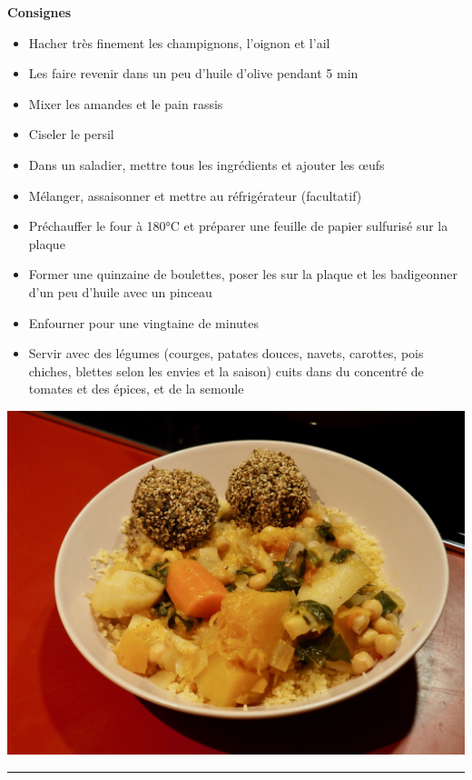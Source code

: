 \documentclass[]{book}
\providecommand{\tightlist}{%
  \setlength{\itemsep}{0pt}\setlength{\parskip}{0pt}}
\begin{document}
\textbf{Consignes}

\begin{itemize}
\tightlist
\item
  Hacher très finement les champignons, l'oignon et l'ail
\item
  Les faire revenir dans un peu d'huile d'olive pendant 5 min
\item
  Mixer les amandes et le pain rassis
\item
  Ciseler le persil
\item
  Dans un saladier, mettre tous les ingrédients et ajouter les œufs
\item
  Mélanger, assaisonner et mettre au réfrigérateur (facultatif)
\item
  Préchauffer le four à 180°C et préparer une feuille de papier sulfurisé sur la plaque
\item
  Former une quinzaine de boulettes, poser les sur la plaque et les badigeonner d'un peu d'huile avec un pinceau
\item
  Enfourner pour une vingtaine de minutes
\item
  Servir avec des légumes (courges, patates douces, navets, carottes, pois chiches, blettes selon les envies et la saison) cuits dans du concentré de tomates et des épices, et de la semoule
\end{itemize}

\begin{center}\includegraphics[width=0.9\linewidth]{photos/couscous} \end{center}

\begin{center}\rule{0.5\linewidth}{0.5pt}\end{center}
\end{document}
